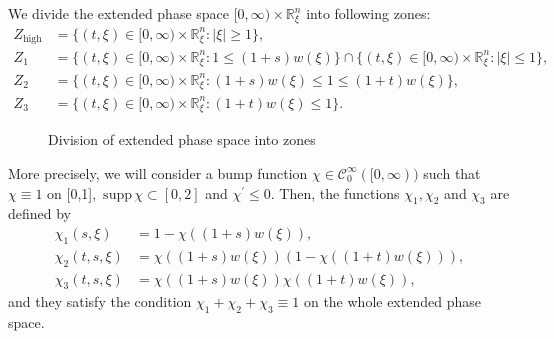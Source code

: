 \documentclass[10pt]{article}
\newcommand{\supp}{{\mathrm{\,supp\,}}}
\newcommand{\<}{\langle}
\renewcommand{\>}{\rangle}
\numberwithin{equation}{section}
\begin{document}
We divide the extended phase space $[0,\infty)\times\mathbb{R}^n_\xi$ into following zones:
\begin{align*}
Z_{\text{high}} &= \{ (t,\xi)\in[0,\infty)\times\mathbb{R}^n_\xi : |\xi|\geq 1 \}, \\
Z_1 &= \big\{ (t,\xi)\in[0,\infty)\times\mathbb{R}^n_\xi : 1\leq (1+s)w(\xi) \big\}\cap\{ (t,\xi)\in[0,\infty)\times\mathbb{R}^n_\xi : |\xi|\leq 1 \}, \\
Z_2 &= \big\{ (t,\xi)\in[0,\infty)\times\mathbb{R}^n_\xi : (1+s)w(\xi)\leq 1\leq (1+t)w(\xi)\big\},\\
Z_3 &= \big\{ (t,\xi)\in[0,\infty)\times\mathbb{R}^n_\xi : (1+t)w(\xi)\leq 1 \big\}.
\end{align*}
\begin{figure}[H]
\begin{center}
\caption{\small Division of extended phase space into zones}
\label{fig.zone}
\end{center}
\end{figure}
More precisely, we will consider a bump function $\chi\in\mathcal{C}_{0}^{\infty}([0, \infty))$ such that $\chi\equiv 1$ on [0,1], $\supp \chi \subset[0,2]$ and $\chi^{\prime} \leq 0$. Then, the functions $\chi_{1}, \chi_{2}$ and $\chi_{3}$ are defined by
\begin{align*}
\chi_{1}(s, \xi) &= 1-\chi\left((1+s)w(\xi)\right), \\
\chi_{2}(t, s, \xi) &= \chi\left((1+s)w(\xi)\right)\left(1-\chi\left((1+t)w(\xi)\right)\right),\\
\chi_{3}(t, s, \xi) &= \chi\left((1+s)w(\xi)\right) \chi\left((1+t)w(\xi)\right),
\end{align*}
and they satisfy the condition $\chi_{1}+\chi_{2}+\chi_{3} \equiv 1$ on the whole extended phase space.
\end{document}
